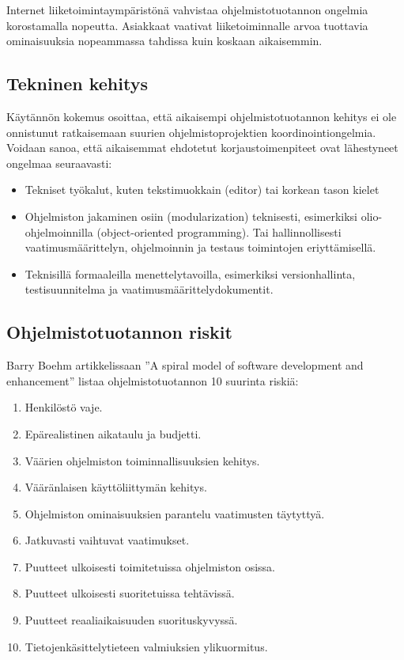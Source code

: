 \documentclass[finnish]{tktltiki2}
\theoremstyle{definition}
\theoremstyle{remark}
\begin{document}
Internet liiketoimintaympäristönä vahvistaa ohjelmistotuotannon ongelmia korostamalla nopeutta. Asiakkaat vaativat liiketoiminnalle arvoa tuottavia ominaisuuksia nopeammassa tahdissa kuin koskaan aikaisemmin\cite{BRL03}.

\subsection{Tekninen kehitys}


Käytännön kokemus osoittaa, että aikaisempi ohjelmistotuotannon kehitys ei ole onnistunut ratkaisemaan suurien ohjelmistoprojektien koordinointiongelmia. 
Voidaan sanoa, että aikaisemmat ehdotetut korjaustoimenpiteet ovat lähestyneet ongelmaa seuraavasti: 
\begin{itemize}
 \item Tekniset työkalut, kuten tekstimuokkain (editor) tai korkean tason kielet
 \item Ohjelmiston jakaminen osiin (modularization) teknisesti, esimerkiksi olio-ohjelmoinnilla (object-oriented programming). Tai hallinnollisesti vaatimusmäärittelyn, ohjelmoinnin ja testaus toimintojen eriyttämisellä.
 \item Teknisillä formaaleilla menettelytavoilla, esimerkiksi versionhallinta, testisuunnitelma ja vaatimusmäärittelydokumentit\cite{KES95}.
\end{itemize}

\subsection{Ohjelmistotuotannon riskit}

Barry Boehm artikkelissaan ''A spiral model of software development and enhancement'' listaa ohjelmistotuotannon 10 suurinta riskiä: 

\begin{enumerate}
  \item Henkilöstö vaje.
  \item Epärealistinen aikataulu ja budjetti.
  \item Väärien ohjelmiston toiminnallisuuksien kehitys.
  \item Vääränlaisen käyttöliittymän kehitys.
  \item Ohjelmiston ominaisuuksien parantelu vaatimusten täytyttyä.
  \item Jatkuvasti vaihtuvat vaatimukset.
  \item Puutteet ulkoisesti toimitetuissa ohjelmiston osissa.
  \item Puutteet ulkoisesti suoritetuissa tehtävissä.
  \item Puutteet reaaliaikaisuuden suorituskyvyssä.
  \item Tietojenkäsittelytieteen valmiuksien ylikuormitus\cite{BOE88}.
\end{enumerate}
\end{document}
